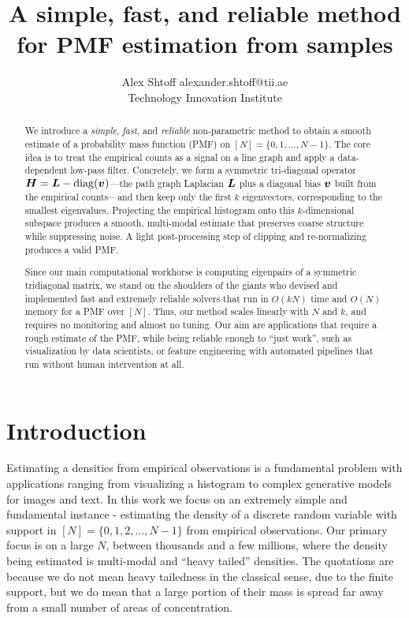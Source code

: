 \documentclass[10pt]{article} %
\title{A simple, fast, and reliable method for PMF estimation from samples}
\author{\name Alex Shtoff \email alexander.shtoff@tii.ae \\ Technology Innovation Institute\\}
\DeclareMathOperator{\diag}{diag}
\begin{document}
\maketitle

\begin{abstract}
We introduce a \emph{simple}, \emph{fast}, and \emph{reliable} non-parametric method to obtain a smooth estimate of a probability mass function (PMF) on $[N] = \{0,1, \dots, N - 1\}$. The core idea is to treat the empirical counts as a signal on a line graph and apply a data-dependent low-pass filter. Concretely, we form a symmetric tri-diagonal operator $\mH = \mL - \diag(\vv)$—the path graph Laplacian ${\bm{L}}$ plus a diagonal bias ${\bm{v}}$ built from the empirical counts—and then keep only the first $k$ eigenvectors, corresponding to the smallest eigenvalues. Projecting the empirical histogram onto this $k$-dimensional subspace produces a smooth, multi-modal estimate that preserves coarse structure while suppressing noise. A light post-processing step of clipping and re-normalizing produces a valid PMF. 

Since our main computational workhorse is computing eigenpairs of a symmetric tridiagonal matrix, we stand on the shoulders of the giants who devised and implemented fast and extremely reliable solvers that run in $O(kN)$ time and $O(N)$ memory for a PMF over $[N]$. Thus, our method scales linearly with $N$ and $k$, and requires no monitoring and almost no tuning. Our aim are applications that require a rough estimate of the PMF, while being reliable enough to ``just work'', such as visualization by data scientists, or feature engineering with automated pipelines that run without human intervention at all.

\end{abstract}

\section{Introduction}
Estimating a densities from empirical observations is a fundamental problem with applications ranging from visualizing a histogram to complex generative models for images and text. In this work we focus on an extremely simple and fundamental instance - estimating the density of a discrete random variable with support in $[N] = \{0, 1, 2, \ldots, N - 1\}$ from empirical observations. Our primary focus is on a large $N$, between thousands and a few millions, where the density being estimated is multi-modal and ``heavy tailed'' densities. The quotations are because we do not mean heavy tailedness in the classical sense, due to the finite support, but we do mean that a large portion of their mass is spread far away from a small number of areas of concentration.
\end{document}
